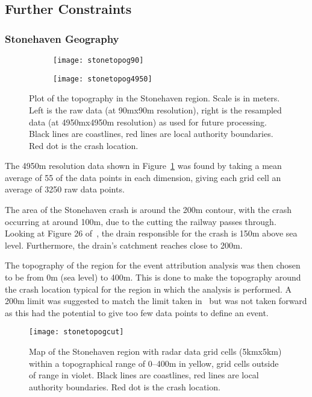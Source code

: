 \subsection{Further Constraints}\label{subsec:furthercons}

\subsubsection{Stonehaven Geography}

\begin{figure}[H]
    \centering
    \begin{subfigure}{0.48\textwidth}
        \centering
        \texttt{[image: stonetopog90]}
    \end{subfigure}
    \hfill
    \begin{subfigure}{0.48\textwidth}
        \centering
        \texttt{[image: stonetopog4950]}
    \end{subfigure}
    \caption[Plot of the topography in the Stonehaven region.]{
        Plot of the topography in the Stonehaven region.
    Scale is in meters.
    Left is the raw data (at 90mx90m resolution),
    right is the resampled data (at 4950mx4950m resolution) as used for future processing.
    Black lines are coastlines, red lines are local authority boundaries.
    Red dot is the crash location.}
    \label{fig:stonetopog}
\end{figure}

The 4950m resolution data shown in Figure~\ref{fig:stonetopog} was found by taking a mean average of 55 of the data points in each dimension,
    giving each grid cell an average of 3250 raw data points.

The area of the Stonehaven crash is around the 200m contour,
    with the crash occurring at around 100m,
    due to the cutting the railway passes through.
Looking at Figure 26 of~\cite{RAIB_2022},
    the drain responsible for the crash is 150m above sea level.
Furthermore, the drain's catchment reaches close to 200m.

The topography of the region for the event attribution analysis was then chosen to be from 0m (sea level)
    to 400m.
This is done to make the topography around the crash location typical for the region in which the analysis is performed.
A 200m limit was suggested
    to match the limit taken in~\cite{Tett_Soon}
    but was not taken forward as this had the potential to give too few data points to define an event.

\begin{figure}[H]
    \begin{center}
        \texttt{[image: stonetopogcut]}
    \end{center}
    \caption[Map of the Stonehaven region with radar data grid cells within a range of 0--400m.]{
        Map of the Stonehaven region with radar data grid cells (5kmx5km) within a topographical range of 0--400m in yellow,
    grid cells outside of range in violet.
    Black lines are coastlines, red lines are local authority boundaries.
    Red dot is the crash location.}
    \label{fig:stonetopogallowed}
\end{figure}

